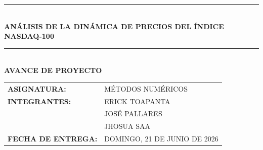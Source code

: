 \thispagestyle{empty}


\vspace*{2cm}
\begin{center}
    \noindent\rule{0.85\textwidth}{0.8pt}\\[0.6cm]
    {\Huge\bfseries ANÁLISIS DE LA DINÁMICA DE PRECIOS DEL ÍNDICE NASDAQ-100}\\[0.3cm]
    \noindent\rule{0.85\textwidth}{0.8pt}\\[2.5cm]
    
    {\Large\bfseries AVANCE DE PROYECTO}\\[4.5cm]
    
    \begin{flushleft}
    \hspace*{1.5cm}
    \begin{tabular}{ll}
        \textbf{ASIGNATURA:} & MÉTODOS NUMÉRICOS \\ [0.6cm]
        \textbf{INTEGRANTES:} & ERICK TOAPANTA \\
                              & JOSÉ PALLARES \\
                              & JHOSUA SAA \\ [0.6cm]
        \textbf{FECHA DE ENTREGA:} & DOMINGO, 21 DE JUNIO DE 2026
    \end{tabular}
    \end{flushleft}
\end{center}
\newpage